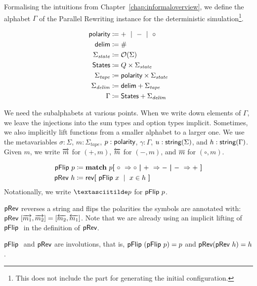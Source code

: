 Formalising the intuitions from Chapter~\ref{chap:informaloverview}, we define the alphabet $\Gamma$ of the Parallel Rewriting instance for the deterministic simulation\footnote{This does not include the part for generating the initial configuration.}.

\newcommand{\stateSigma}{\Sigma_{\mathit{state}}}
\newcommand{\delimSigma}{\Sigma_{\mathit{delim}}}
\newcommand{\tapeSigma}{\Sigma_{\mathit{tape}}}
\newcommand{\States}{\textsf{States}}

\begin{align*}
  \polarity &\defeq + \bnfmid - \bnfmid \circ \\
  \textsf{delim} &\defeq \# \\
  \stateSigma &\defeq \opt{\Sigma} \\
  \States &\defeq Q \times \stateSigma \\
  \tapeSigma &\defeq \polarity \times \stateSigma \\
  \delimSigma &\defeq \textsf{delim} + \tapeSigma \\
  \Gamma &\defeq \States + \delimSigma
\end{align*}

We need the subalphabets at various points. When we write down elements of $\Gamma$, we leave the injections into the sum types and option types implicit. Sometimes, we also implicitly lift functions from a smaller alphabet to a larger one.
We use the metavariables $\sigma : \Sigma$, $m : \tapeSigma$, $p : \textsf{polarity}$, $\gamma : \Gamma$, $u : \textsf{string}{(\Sigma)}$, and $h : \textsf{string}{(\Gamma)}$. 
Given $m$, we write $\overrightarrow{m}$ for $(+, m)$, $\overleftarrow{m}$ for $(-, m)$, and $\overline{m}$ for $(\circ, m)$. 

\begin{definition}
  \begin{align*}
    \textsf{pFlip}~p &\coloneqq \textbf{match}~ p \textbf{[}~ \circ~\Rightarrow \circ ~\textbf{|}~ +~\Rightarrow - ~\textbf{|}~ -~\Rightarrow +~\textbf{]} \\
    \textsf{pRev}~h &\coloneqq \mathsf{rev}{\textbf{[}~\textsf{pFlip}~x ~\mid~ x \in h~\textbf{]}}
  \end{align*}
  Notationally, we write $\pFlipi{p}$ for $\textsf{pFlip}~p$. 
\end{definition}
$\textsf{pRev}$ reverses a string and flips the polarities the symbols are annotated with: $\textsf{pRev}~[\overrightarrow{m_1}, \overrightarrow{m_2}] = [\overleftarrow{m_2}, \overleftarrow{m_1}]$. 
Note that we are already using an implicit lifting of $\textsf{pFlip}~$ in the definition of $\textsf{pRev}$. 

\begin{fact}[Involutions]\label{fact:prev_involution}
  $\textsf{pFlip}~$ and $\textsf{pRev}{}$ are involutions, that is, $\textsf{pFlip}~(\textsf{pFlip}~p) = p$ and $\textsf{pRev}{(\textsf{pRev}~h)} = h$. 
\end{fact}

